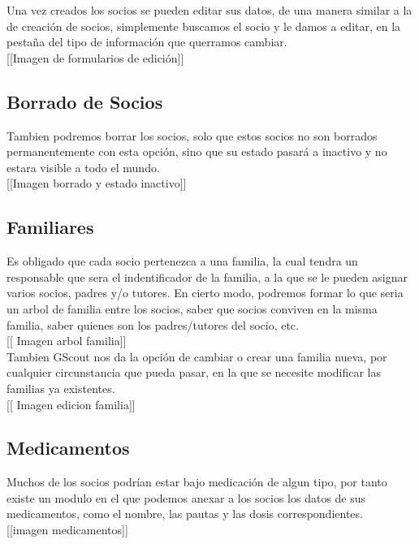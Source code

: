 Una vez creados los socios se pueden editar sus datos, de una manera similar a la de creación de socios, simplemente buscamos el socio y le damos a editar, en la pestaña del tipo de información
que querramos cambiar.\\

[[Imagen de formularios de edición]]

\subsection{Borrado de Socios}
Tambien podremos borrar los socios, solo que estos socios no son borrados permanentemente con esta opción, sino que su estado pasará a inactivo y no estara visible a todo el mundo.\\

[[Imagen borrado y estado inactivo]]

\subsection{Familiares}

Es obligado que cada socio pertenezca a una familia, la cual tendra un responsable que sera el indentificador de la familia, a la que se le pueden asignar varios socios, padres y/o tutores. En cierto modo, podremos
formar lo que seria un arbol de familia entre los socios, saber que socios conviven en la misma familia, saber quienes son los padres/tutores del socio, etc.\\

[[ Imagen arbol familia]]\\

Tambien GScout nos da la opción de cambiar o crear una familia nueva, por cualquier circunstancia que pueda pasar, en la que se necesite modificar las familias ya existentes.\\

[[ Imagen edicion familia]]

\subsection{Medicamentos}

Muchos de los socios podrían estar bajo medicación de algun tipo, por tanto existe un modulo en el que podemos anexar a los socios los datos de sus medicamentos, como el nombre, las pautas y las dosis correspondientes.\\

[[imagen medicamentos]]

